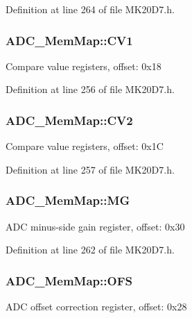 Definition at line 264 of file M\+K20\+D7.\+h.

\subsubsection[{\texorpdfstring{C\+V1}{CV1}}]{ A\+D\+C\+\_\+\+Mem\+Map\+::\+C\+V1}\hypertarget{struct_a_d_c___mem_map_af687bec25a698b31731350c05cd5ba05}{}\label{struct_a_d_c___mem_map_af687bec25a698b31731350c05cd5ba05}
Compare value registers, offset\+: 0x18 

Definition at line 256 of file M\+K20\+D7.\+h.

\subsubsection[{\texorpdfstring{C\+V2}{CV2}}]{ A\+D\+C\+\_\+\+Mem\+Map\+::\+C\+V2}\hypertarget{struct_a_d_c___mem_map_acf6745fccc765451358e179f7131e645}{}\label{struct_a_d_c___mem_map_acf6745fccc765451358e179f7131e645}
Compare value registers, offset\+: 0x1C 

Definition at line 257 of file M\+K20\+D7.\+h.

\subsubsection[{\texorpdfstring{MG}{MG}}]{ A\+D\+C\+\_\+\+Mem\+Map\+::\+MG}\hypertarget{struct_a_d_c___mem_map_ae615bad0b39c73a03fdebeb83f4beb91}{}\label{struct_a_d_c___mem_map_ae615bad0b39c73a03fdebeb83f4beb91}
A\+DC minus-\/side gain register, offset\+: 0x30 

Definition at line 262 of file M\+K20\+D7.\+h.

\subsubsection[{\texorpdfstring{O\+FS}{OFS}}]{ A\+D\+C\+\_\+\+Mem\+Map\+::\+O\+FS}\hypertarget{struct_a_d_c___mem_map_a89e51c569b4a0e4298bc4524afabb594}{}\label{struct_a_d_c___mem_map_a89e51c569b4a0e4298bc4524afabb594}
A\+DC offset correction register, offset\+: 0x28 

